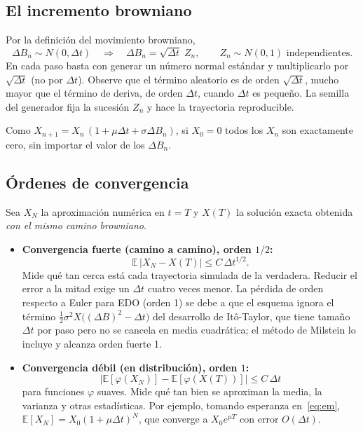 \documentclass[11pt,a4paper]{article}
\newcommand{\E}{\mathbb{E}}
\begin{document}
\subsection{El incremento browniano}

Por la definición del movimiento browniano,
\begin{equation}
    \Delta B_n \sim N(0, \Delta t)
    \quad\Longrightarrow\quad
    \Delta B_n = \sqrt{\Delta t}\; Z_n, \qquad Z_n \sim N(0,1) \text{ independientes}.
\end{equation}
En cada paso basta con generar un número normal estándar y multiplicarlo por $\sqrt{\Delta t}$ (no por $\Delta t$). Observe que el término aleatorio es de orden $\sqrt{\Delta t}$, mucho mayor que el término de deriva, de orden $\Delta t$, cuando $\Delta t$ es pequeño. La semilla del generador fija la sucesión $Z_n$ y hace la trayectoria reproducible.

Como $X_{n+1} = X_n\,(1 + \mu\Delta t + \sigma\Delta B_n)$, si $X_0 = 0$ todos los $X_n$ son exactamente cero, sin importar el valor de los $\Delta B_n$.

\subsection{Órdenes de convergencia}

Sea $X_N$ la aproximación numérica en $t = T$ y $X(T)$ la solución exacta obtenida \emph{con el mismo camino browniano}.

\begin{itemize}
    \item \textbf{Convergencia fuerte (camino a camino), orden $1/2$:}
    \begin{equation}
        \E\,|X_N - X(T)| \le C\,\Delta t^{1/2}.
    \end{equation}
    Mide qué tan cerca está cada trayectoria simulada de la verdadera. Reducir el error a la mitad exige un $\Delta t$ cuatro veces menor. La pérdida de orden respecto a Euler para EDO (orden 1) se debe a que el esquema ignora el término $\tfrac12\sigma^2 X\big((\Delta B)^2 - \Delta t\big)$ del desarrollo de Itô-Taylor, que tiene tamaño $\Delta t$ por paso pero no se cancela en media cuadrática; el método de Milstein lo incluye y alcanza orden fuerte 1.
    \item \textbf{Convergencia débil (en distribución), orden $1$:}
    \begin{equation}
        \big|\E[\varphi(X_N)] - \E[\varphi(X(T))]\big| \le C\,\Delta t
    \end{equation}
    para funciones $\varphi$ suaves. Mide qué tan bien se aproximan la media, la varianza y otras estadísticas. Por ejemplo, tomando esperanza en~\eqref{eq:em}, $\E[X_N] = X_0(1 + \mu\Delta t)^N$, que converge a $X_0e^{\mu T}$ con error $O(\Delta t)$.
\end{itemize}
\end{document}
